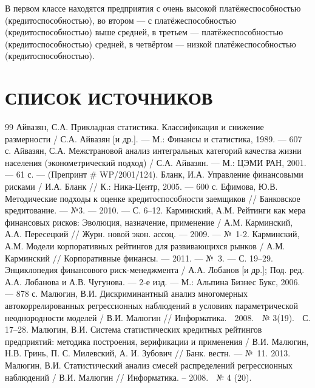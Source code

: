 \documentclass[14pt,a4paper]{extarticle}
\begin{document}
В первом классе находятся предприятия с очень высокой платёжеспособностью 
(кредитоспособностью), во втором --- с платёжеспособностью (кредитоспособностью) 
выше средней, в третьем --- платёжеспособностью (кредитоспособностью) средней, в 
четвёртом --- низкой платёжеспособностью (кредитоспособностью).

\clearpage

\section*{СПИСОК ИСТОЧНИКОВ}

\begin{thebibliography}{99}
\makeatletter
\renewcommand{\@biblabel}[1]{#1.\ }
\makeatother
{} Айвазян, С.А. Прикладная статистика. Классификация и снижение размерности / С.А. Айвазян [и др.]. --- М.: Финансы и статистика, 1989. --- 607 с.
 Айвазян, С.А. Межстрановой анализ интегральных категорий качества жизни населения (эконометрический подход) / С.А. Айвазян. --- М.: ЦЭМИ РАН, 2001. --- 61 с. --- (Препринт \# WP/2001/124).
 Бланк, И.А. Управление финансовыми рисками / И.А. Бланк // К.: Ника-Центр, 2005. --- 600 с.
 Ефимова, Ю.В. Методические подходы к оценке кредитоспособности заемщиков // Банковское кредитование. --- №3. --- 2010. --- С. 6--12.
 Карминский, А.М. Рейтинги как мера финансовых рисков: Эволюция, назначение, применение / А.М. Карминский, А.А. Пересецкий // Журн. новой экон. ассоц. --- 2009. --- №~1-2.
 Карминский, А.М. Модели корпоративных рейтингов для развивающихся рынков / А.М. Карминский // Корпоративные финансы. --- 2011. --- №~3. --- С. 19--29.
 Энциклопедия финансового риск-менеджмента / А.А. Лобанов [и др.]; Под. ред. А.А. Лобанова и А.В. Чугунова. --- 2-е изд. --- М.: Альпина Бизнес Букс, 2006. --- 878 с.
 Малюгин, В.И. Дискриминантный анализ многомерных автокоррелированных регрессионных наблюдений в условиях параметрической неоднородности моделей / В.И. Малюгин // Информатика.  2008.  № 3(19).  С. 17–28.
 Малюгин, В.И. Система статистических кредитных рейтингов предприятий: методика построения, верификации и применения / В.И. Малюгин, Н.В. Гринь, П. С. Милевский, А. И. Зубович // Банк. вестн. --- №~11. 2013.
 Малюгин, В.И. Статистический анализ смесей распределений регрессионных наблюдений / В.И. Малюгин // Информатика. – 2008.  № 4 (20).

\end{thebibliography}
\end{document}
